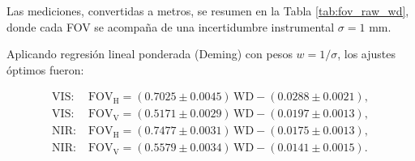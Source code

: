      Las mediciones, convertidas a metros, se resumen en la Tabla \ref{tab:fov_raw_wd}, donde cada FOV se acompaña de una incertidumbre instrumental \(\sigma=1\) mm.
     
 
     
     
     Aplicando regresión lineal ponderada (Deming) con pesos \(w=1/\sigma\), los ajustes óptimos fueron:
     
     \[
     \begin{aligned}
     \text{VIS:}\;&\mathrm{FOV_H}=(0.7025\pm0.0045)\,\mathrm{WD}-(0.0288\pm0.0021),\\
     \text{VIS:}\;&\mathrm{FOV_V}=(0.5171\pm0.0029)\,\mathrm{WD}-(0.0197\pm0.0013),\\
     \text{NIR:}\;&\mathrm{FOV_H}=(0.7477\pm0.0031)\,\mathrm{WD}-(0.0175\pm0.0013),\\
     \text{NIR:}\;&\mathrm{FOV_V}=(0.5579\pm0.0034)\,\mathrm{WD}-(0.0141\pm0.0015).
     \end{aligned}
     \]
     

